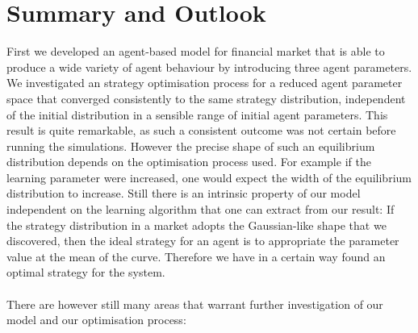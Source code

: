 \documentclass[11pt]{article}
\begin{document}
\section{Summary and Outlook}
First we developed an agent-based model for financial market that is able to produce a wide variety of agent behaviour by introducing three agent parameters. We investigated an strategy optimisation process for a reduced agent parameter space that converged consistently to the same strategy distribution, independent of the initial distribution in a sensible range of initial agent parameters. This result is quite remarkable, as such a consistent outcome was not certain before running the simulations. However the precise shape of such an equilibrium distribution depends on the optimisation process used. For example if the learning parameter were increased, one would expect the width of the equilibrium distribution to increase. Still there is an intrinsic property of our model independent on the learning algorithm that one can extract from our result: If the strategy distribution in a market adopts the Gaussian-like shape that we discovered, then the ideal strategy for an agent is to appropriate the parameter value at the mean of the curve. Therefore we have in a certain way found an optimal strategy for the system. \\
\hfill \\
There are however still many areas that warrant further investigation of our model and our optimisation process:
\end{document}
